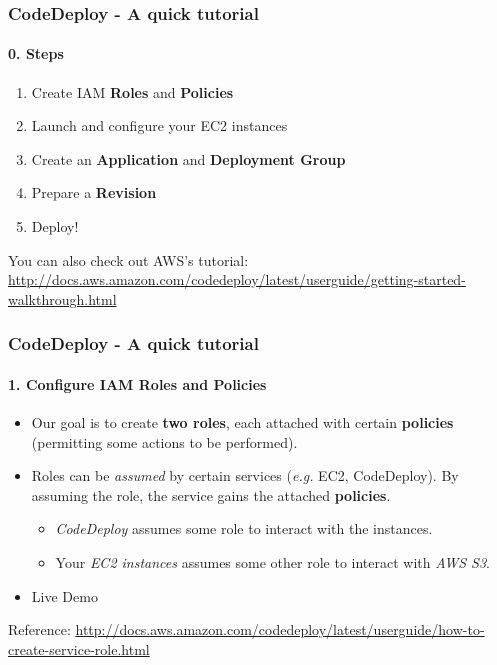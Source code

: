 \documentclass[10pt]{beamer}
\begin{document}
\begin{frame}
    \frametitle{CodeDeploy - A quick tutorial}
    \framesubtitle{0. Steps}
    \begin{enumerate}
        \item Create IAM {\bf Roles} and {\bf Policies}
        \item Launch and configure your EC2 instances
        \item Create an {\bf Application} and {\bf Deployment Group}
        \item Prepare a {\bf Revision}
        \item Deploy!
    \end{enumerate}

    {\tiny You can also check out AWS's tutorial: \url{http://docs.aws.amazon.com/codedeploy/latest/userguide/getting-started-walkthrough.html}}
\end{frame}

\begin{frame}
    \frametitle{CodeDeploy - A quick tutorial}
    \framesubtitle{1. Configure IAM Roles and Policies}

    \begin{itemize}
        \item Our goal is to create {\bf two roles}, each attached with certain {\bf policies} (permitting some actions to be performed).
        \item Roles can be {\it assumed} by certain services ({\it e.g.} EC2, CodeDeploy). 
            By assuming the role, the service gains the attached {\bf policies}.
            \begin{itemize}
                \item {\it CodeDeploy} assumes some role to interact with the instances.
                \item Your {\it EC2 instances} assumes some other role to interact with {\it AWS S3}.
            \end{itemize}
        \pause
        \item Live Demo
    \end{itemize}
    {\tiny Reference: \url{http://docs.aws.amazon.com/codedeploy/latest/userguide/how-to-create-service-role.html}}
\end{frame}
\end{document}
